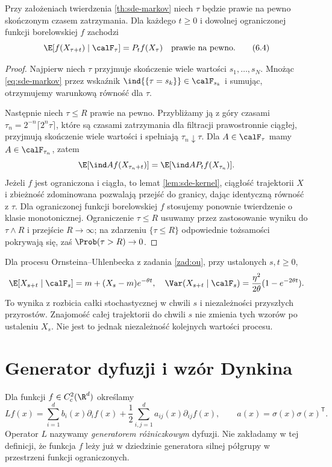 \begin{twierdzenie}
\label{th:sde-strongmarkov}
Przy założeniach twierdzenia \ref{th:sde-markov}
niech $\tau$ będzie prawie na pewno skończonym
czasem zatrzymania. Dla każdego $t\ge0$ i dowolnej
ograniczonej funkcji borelowskiej $f$ zachodzi
\[
\E[f(X_{\tau+t})\mid\calF_\tau]=P_tf(X_\tau)
\quad\text{prawie na pewno}.
\tag{6.4}\label{eq:sde-strongmarkov}
\]
\end{twierdzenie}
\begin{proof}
Najpierw niech $\tau$ przyjmuje skończenie wiele
wartości $s_1,\ldots,s_N$. Mnożąc
\eqref{eq:sde-markov} przez wskaźnik
$\ind{\{\tau=s_k\}}\in\calF_{s_k}$ i sumując,
otrzymujemy warunkową równość dla $\tau$.

Następnie niech $\tau\le R$ prawie na pewno.
Przybliżamy ją z góry czasami
$\tau_n=2^{-n}\lceil2^n\tau\rceil$,
które są czasami zatrzymania dla filtracji
prawostronnie ciągłej, przyjmują skończenie wiele
wartości i spełniają $\tau_n\downarrow\tau$.
Dla $A\in\calF_\tau$ mamy $A\in\calF_{\tau_n}$,
zatem
\[
\E[\ind A f(X_{\tau_n+t})]
=\E[\ind A P_tf(X_{\tau_n})].
\]
Jeżeli $f$ jest ograniczona i ciągła, to lemat
\ref{lem:sde-kernel}, ciągłość trajektorii $X$
i zbieżność zdominowana pozwalają przejść do granicy,
dając identyczną równość z $\tau$.
Dla ograniczonej funkcji borelowskiej $f$ stosujemy
ponownie twierdzenie o klasie monotonicznej.
Ograniczenie $\tau\le R$ usuwamy przez zastosowanie
wyniku do $\tau\wedge R$ i przejście $R\to\infty$;
na zdarzeniu $\{\tau\le R\}$ odpowiednie tożsamości
pokrywają się, zaś $\Prob(\tau>R)\to0$.
\end{proof}

\begin{przyklad}
Dla procesu Ornsteina--Uhlenbecka z zadania
\ref{zad:ou}, przy ustalonych $s,t\ge0$,
\[
\E[X_{s+t}\mid\calF_s]
=m+(X_s-m)e^{-\theta t},
\quad
\Var(X_{s+t}\mid\calF_s)
=\frac{\eta^2}{2\theta}(1-e^{-2\theta t}).
\]
To wynika z rozbicia całki stochastycznej w chwili
$s$ i niezależności przyszłych przyrostów. Znajomość
całej trajektorii do chwili $s$ nie zmienia tych
wzorów po ustaleniu $X_s$. Nie jest to jednak
niezależność kolejnych wartości procesu.
\end{przyklad}

\section{Generator dyfuzji i wzór Dynkina}
\begin{definicja}
Dla funkcji $f\in C_c^2(\R^d)$ określamy
\[
Lf(x)=\sum_{i=1}^d b_i(x)\partial_i f(x)
+\frac12\sum_{i,j=1}^d a_{ij}(x)\partial_{ij}f(x),
\qquad a(x)=\sigma(x)\sigma(x)^{\mathsf T}.
\tag{6.5}\label{eq:sde-generator}
\]
Operator $L$ nazywamy \emph{generatorem różniczkowym}
dyfuzji. Nie zakładamy w tej definicji, że funkcja
$f$ leży już w dziedzinie generatora silnej półgrupy
w przestrzeni funkcji ograniczonych.
\end{definicja}

